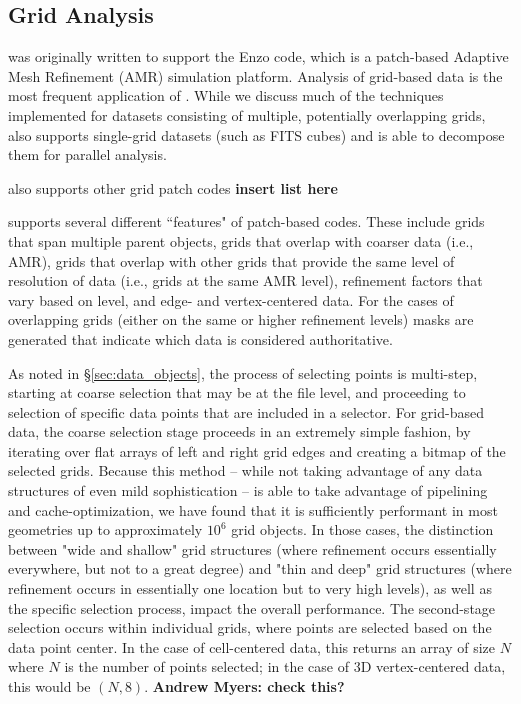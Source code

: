 \subsection{Grid Analysis}

\yt{} was originally written to support the Enzo code, which is a patch-based
Adaptive Mesh Refinement (AMR) simulation platform.  Analysis of grid-based
data is the most frequent application of \yt{}.  While we discuss much of the
techniques implemented for datasets consisting of multiple, potentially
overlapping grids, \yt{} also supports single-grid datasets (such as FITS
cubes) and is able to decompose them for parallel analysis.

\yt{} also supports other grid patch codes \textbf{insert list here}

\yt{} supports several different ``features" of patch-based codes.  These
include grids that span multiple parent objects, grids that overlap with
coarser data (i.e., AMR), grids that overlap with other grids that provide the
same level of resolution of data (i.e., grids at the same AMR level),
refinement factors that vary based on level, and edge- and vertex-centered
data.  For the cases of overlapping grids (either on the same or higher
refinement levels) masks are generated that indicate which data is considered
authoritative.

As noted in \S \ref{sec:data_objects}, the process of selecting points is
multi-step, starting at coarse selection that may be at the file level, and
proceeding to selection of specific data points that are included in a
selector.  For grid-based data, the coarse selection stage proceeds in an
extremely simple fashion, by iterating over flat arrays of left and right grid
edges and creating a bitmap of the selected grids.  Because this method --
while not taking advantage of any data structures of even mild sophistication
-- is able to take advantage of pipelining and cache-optimization, we have
found that it is sufficiently performant in most geometries up to approximately
$10^6$ grid objects.  In those cases, the distinction between "wide and
shallow" grid structures (where refinement occurs essentially everywhere, but
not to a great degree) and "thin and deep" grid structures (where refinement
occurs in essentially one location but to very high levels), as well as the
specific selection process, impact the overall performance.  The second-stage
selection occurs within individual grids, where points are selected based on
the data point center.  In the case of cell-centered data, this returns an
array of size $N$ where $N$ is the number of points selected; in the case of
3D vertex-centered data, this would be $(N,8)$. \textbf{Andrew Myers: check
this?}

